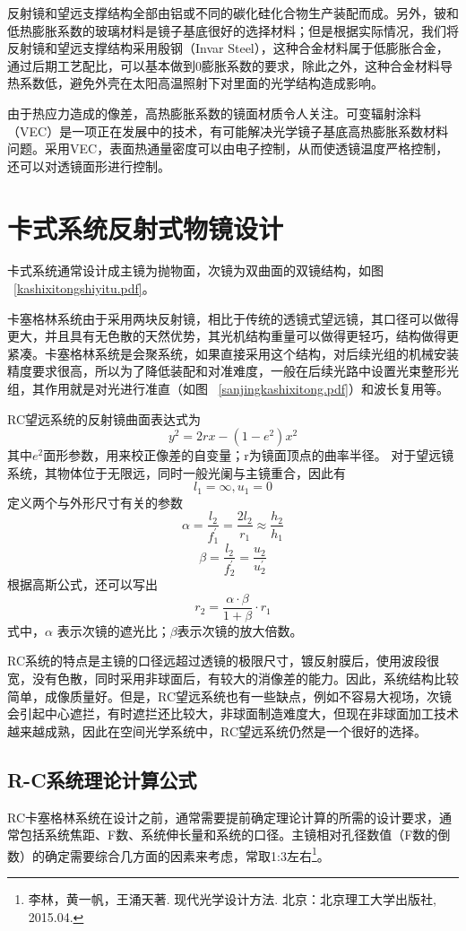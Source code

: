 反射镜和望远支撑结构全部由铝或不同的碳化硅化合物生产装配而成。另外，铍和低热膨胀系数的玻璃材料是镜子基底很好的选择材料；但是根据实际情况，我们将反射镜和望远支撑结构采用殷钢（Invar Steel），这种合金材料属于低膨胀合金，通过后期工艺配比，可以基本做到0膨胀系数的要求，除此之外，这种合金材料导热系数低，避免外壳在太阳高温照射下对里面的光学结构造成影响。

由于热应力造成的像差，高热膨胀系数的镜面材质令人关注。可变辐射涂料（VEC）是一项正在发展中的技术，有可能解决光学镜子基底高热膨胀系数材料问题。采用VEC，表面热通量密度可以由电子控制，从而使透镜温度严格控制，还可以对透镜面形进行控制。


\section{卡式系统反射式物镜设计}

卡式系统通常设计成主镜为抛物面，次镜为双曲面的双镜结构，如图 ~\ref{kashixitongshiyitu.pdf}。


卡塞格林系统由于采用两块反射镜，相比于传统的透镜式望远镜，其口径可以做得更大，并且具有无色散的天然优势，其光机结构重量可以做得更轻巧，结构做得更紧凑。卡塞格林系统是会聚系统，如果直接采用这个结构，对后续光组的机械安装精度要求很高，所以为了降低装配和对准难度，一般在后续光路中设置光束整形光组，其作用就是对光进行准直（如图 ~\ref{sanjingkashixitong.pdf}）和波长复用等。

RC望远系统的反射镜曲面表达式为
$$ y^2 = 2rx-(1-e^2 )x^2 $$
其中$ e^2  $面形参数，用来校正像差的自变量；r为镜面顶点的曲率半径。
对于望远镜系统，其物体位于无限远，同时一般光阑与主镜重合，因此有
$$ l_1=\infty,u_1=0 $$
定义两个与外形尺寸有关的参数
$$ \alpha = \dfrac{l_2}{f_{1}^{'}} = \dfrac{2l_2}{r_1} \approx \dfrac{h_2}{h_1}$$
$$ \beta = \dfrac{l_2 ^{}}{f_{2}^{'}} =  \dfrac{u_2}{u_2^{'}}$$
根据高斯公式，还可以写出
$$ r_{2} =  \dfrac{\alpha \cdot\beta}{1+\beta}\cdot r_1$$
式中，$ \alpha $ 表示次镜的遮光比；$ \beta $表示次镜的放大倍数。

RC系统的特点是主镜的口径远超过透镜的极限尺寸，镀反射膜后，使用波段很宽，没有色散，同时采用非球面后，有较大的消像差的能力。因此，系统结构比较简单，成像质量好。但是，RC望远系统也有一些缺点，例如不容易大视场，次镜会引起中心遮拦，有时遮拦还比较大，非球面制造难度大，但现在非球面加工技术越来越成熟，因此在空间光学系统中，RC望远系统仍然是一个很好的选择。
\subsection{R-C系统理论计算公式}
RC卡塞格林系统在设计之前，通常需要提前确定理论计算的所需的设计要求，通常包括系统焦距、F数、系统伸长量和系统的口径。主镜相对孔径数值（F数的倒数）的确定需要综合几方面的因素来考虑，常取1:3左右\citep{Li.2015}\footnote{李林，黄一帆，王涌天著. 现代光学设计方法. 北京：北京理工大学出版社, 2015.04. }。

